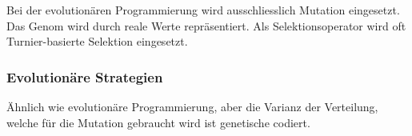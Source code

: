      Bei der evolutionären Programmierung wird ausschliesslich Mutation eingesetzt.
      Das Genom wird durch reale Werte repräsentiert. Als Selektionsoperator wird
      oft Turnier-basierte Selektion eingesetzt.

    \subsubsection{Evolutionäre Strategien\label{item:evStrat}}

        Ähnlich wie evolutionäre Programmierung, aber die Varianz der Verteilung,
        welche für die Mutation gebraucht wird ist genetische codiert.
